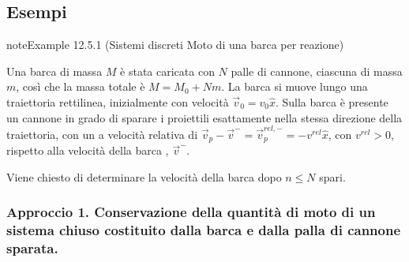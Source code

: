 \documentclass[letterpaper,10pt,italian]{jupyterBook}
\begin{document}
\subsection{Esempi}
\label{\detokenize{ch/mechanics/dynamics-eom-open:esempi}}\label{ch/mechanics/dynamics-eom-open:mechanics:dynamics:open:ex:boat}
\begin{sphinxadmonition}{note}{Example 12.5.1 (Sistemi discreti \sphinxhyphen{} Moto di una barca per reazione)}



\sphinxAtStartPar
Una barca di massa \(M\) è stata caricata con \(N\) palle di cannone, ciascuna di massa \(m\), così che la massa totale è \(M = M_0 + N m\). La barca si muove lungo una traiettoria rettilinea, inizialmente con velocità \(\vec{v}_0 = v_0 \hat{x}\). Sulla barca è presente un cannone in grado di sparare i proiettili esattamente nella stessa direzione della traiettoria, con un a velocità relativa di \(\vec{v}_p - \vec{v}^- = \vec{v}_p^{rel,-} = - v^{rel} \hat{x}\), con \(v^{rel} > 0\), rispetto alla velocità della barca , \(\vec{v}^-\).

\sphinxAtStartPar
Viene chiesto di determinare la velocità della barca dopo \(n \le N\) spari.  

\sphinxAtStartPar
{}
\subsubsection*{Approccio 1. Conservazione della quantità di moto di un sistema chiuso costituito dalla barca e dalla palla di cannone sparata.}




\end{sphinxadmonition}
\end{document}
